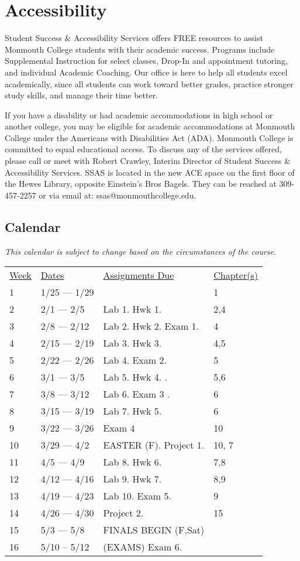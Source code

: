 \documentclass[10pt]{article}
\begin{document}
\section{Accessibility}

Student Success \& Accessibility Services offers FREE resources to assist Monmouth College students with their academic success. Programs include Supplemental Instruction for select classes, Drop-In and appointment tutoring, and individual Academic Coaching. Our office is here to help all students excel academically, since all students can work toward better grades, practice stronger study skills, and manage their time better.

If you have a disability or had academic accommodations in high school or another college, you may be eligible for academic accommodations at Monmouth College under the Americans with Disabilities Act (ADA). Monmouth College is committed to equal educational access. To discuss any of the services offered, please call or meet with Robert Crawley, Interim Director of Student Success \& Accessibility Services.  SSAS is located in the new ACE space on the first floor of the Hewes Library, opposite Einstein’s Bros Bagels. They can be reached at 309-457-2257 or via email at: ssas@monmouthcollege.edu.

\subsection{Calendar}

\textit{This calendar is subject to change based on the circumstances of the course.}

\begin{center}
\begin{tabular}{llll}
\underline{Week} & \underline{Dates} & \underline{Assignments Due} & \underline{Chapter(s)}\\
1 & 1/25 --- 1/29  &  &  1\\
2 & 2/1 --- 2/5 & Lab 1. Hwk 1. & 2,4\\
3 & 2/8 --- 2/12 & Lab 2. Hwk 2. Exam 1.  &  4  \\
4 & 2/15 --- 2/19  & Lab 3. Hwk 3. &   4,5 \\
5 & 2/22 --- 2/26 & Lab 4. Exam 2. & 5\\
6 & 3/1 --- 3/5 & Lab 5. Hwk 4. . & 5,6\\
7 & 3/8 --- 3/12 & Lab 6. Exam 3 . &   6 \\
8 & 3/15 --- 3/19 & Lab 7.  Hwk 5. &  6 \\
9 & 3/22 --- 3/26  & Exam 4 & 10  \\
10 & 3/29 --- 4/2  & EASTER (F). Project 1. &  10, 7  \\
11 & 4/5 --- 4/9 &  Lab 8. Hwk 6. &  7,8 \\
12 & 4/12 --- 4/16 &  Lab 9. Hwk 7. & 8,9 \\
13 & 4/19 --- 4/23 & Lab 10. Exam 5.  &  9 \\
14 & 4/26 --- 4/30 &  Project 2. &  15 \\
15 & 5/3 --- 5/8 & FINALS BEGIN (F,Sat)  &  \\
16 & 5/10 -- 5/12 & (EXAMS) Exam 6. &  \\
\end{tabular}
\end{center}
\end{document}
